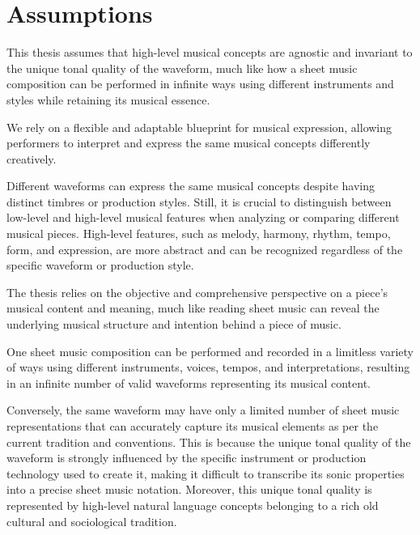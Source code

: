 \section{Assumptions}

This thesis assumes that high-level musical concepts are agnostic and invariant to the unique tonal quality of the waveform, much like how a sheet music composition can be performed in infinite ways using different instruments and styles while retaining its musical essence. 

We rely on a flexible and adaptable blueprint for musical expression, allowing performers to interpret and express the same musical concepts differently creatively. 

Different waveforms can express the same musical concepts despite having distinct timbres or production styles. Still, it is crucial to distinguish between low-level and high-level musical features when analyzing or comparing different musical pieces. High-level features, such as melody, harmony, rhythm, tempo, form, and expression, are more abstract and can be recognized regardless of the specific waveform or production style. 

The thesis relies on the objective and comprehensive perspective on a piece's musical content and meaning, much like reading sheet music can reveal the underlying musical structure and intention behind a piece of music. 

One sheet music composition can be performed and recorded in a limitless variety of ways using different instruments, voices, tempos, and interpretations, resulting in an infinite number of valid waveforms representing its musical content.

Conversely, the same waveform may have only a limited number of sheet music representations that can accurately capture its musical elements as per the current tradition and conventions. This is because the unique tonal quality of the waveform is strongly influenced by the specific instrument or production technology used to create it, making it difficult to transcribe its sonic properties into a precise sheet music notation. Moreover, this unique tonal quality is represented by high-level natural language concepts belonging to a rich old cultural and sociological tradition.

